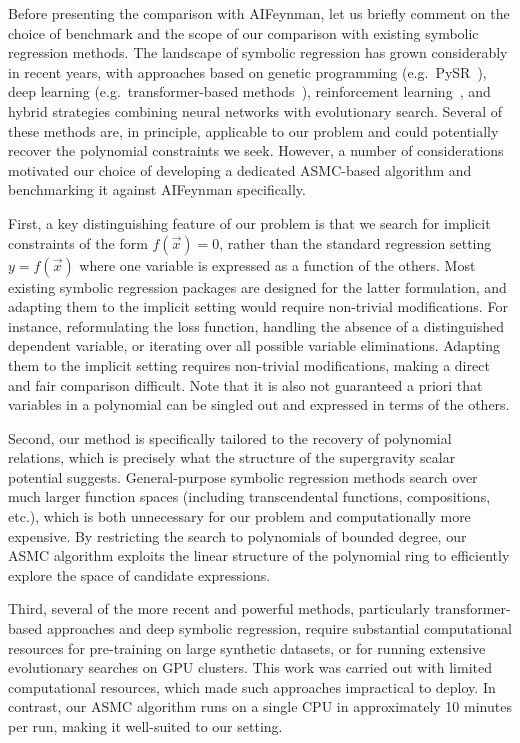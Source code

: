 \documentclass[11pt,a4paper]{article}
\begin{document}
Before presenting the comparison with AIFeynman, let us briefly comment on the choice of benchmark and the scope of our comparison with existing symbolic regression methods. The landscape of symbolic regression has grown considerably in recent years, with approaches based on genetic programming (e.g.\ PySR~\cite{Cranmer2023}), deep learning (e.g.\ transformer-based methods~\cite{Kamienny2022, Biggio2021}), reinforcement learning~\cite{Petersen2021}, and hybrid strategies combining neural networks with evolutionary search. Several of these methods are, in principle, applicable to our problem and could potentially recover the polynomial constraints we seek. However, a number of considerations motivated our choice of developing a dedicated ASMC-based algorithm and benchmarking it against AIFeynman specifically.

First, a key distinguishing feature of our problem is that we search for implicit constraints of the form $f(\vec{x}) = 0$, rather than the standard regression setting $y = f(\vec{x})$ where one variable is expressed as a function of the others. Most existing symbolic regression packages are designed for the latter formulation, and adapting them to the implicit setting would require non-trivial modifications. For instance, reformulating the loss function, handling the absence of a distinguished dependent variable, or iterating over all possible variable eliminations. Adapting them to the implicit setting requires non-trivial modifications, making a direct and fair comparison difficult. Note that it is also not guaranteed a priori that variables in a polynomial can be singled out and expressed in terms of the others. 

Second, our method is specifically tailored to the recovery of polynomial relations, which is precisely what the structure of the supergravity scalar potential suggests. General-purpose symbolic regression methods search over much larger function spaces (including transcendental functions, compositions, etc.), which is both unnecessary for our problem and computationally more expensive. By restricting the search to polynomials of bounded degree, our ASMC algorithm exploits the linear structure of the polynomial ring to efficiently explore the space of candidate expressions.

Third, several of the more recent and powerful methods, particularly transformer-based approaches and deep symbolic regression, require substantial computational resources for pre-training on large synthetic datasets, or for running extensive evolutionary searches on GPU clusters. This work was carried out with limited computational resources, which made such approaches impractical to deploy. In contrast, our ASMC algorithm runs on a single CPU in approximately 10 minutes per run, making it well-suited to our setting.
\end{document}
